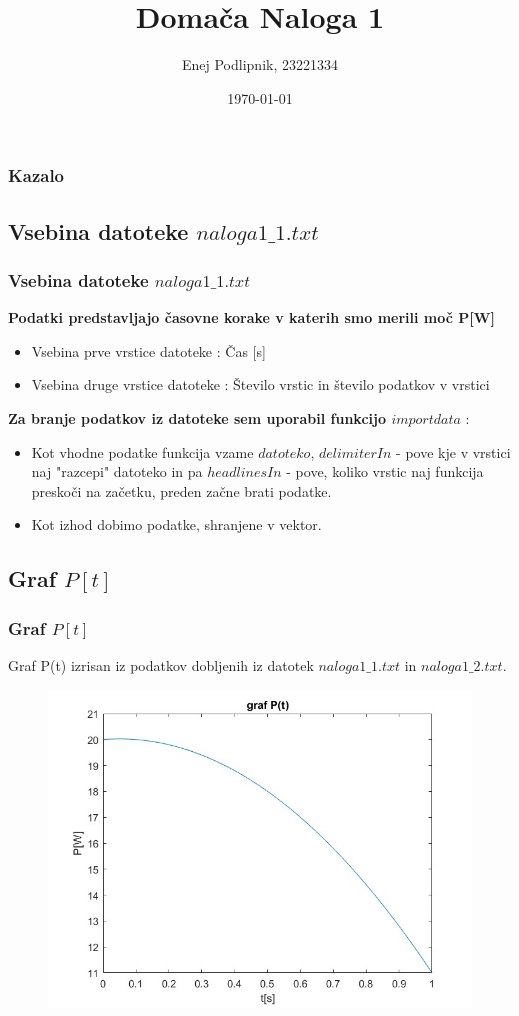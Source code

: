 \documentclass[10pt]{beamer}
\title{Domača Naloga 1}
\author{Enej Podlipnik, 23221334}
\institute{Fakulteta za strojništvo, Univerza v Ljubljani}
\date{\today}
\begin{document}
 
\frame{\titlepage}

\begin{frame}
\frametitle{Kazalo}
 \tableofcontents[sectionstyle=show, subsectionstyle=show]
\end{frame}

\begin{frame} 
\section{Vsebina datoteke $naloga1\_1.txt$}
\frametitle{Vsebina datoteke $naloga1\_ 1.txt$}
\textbf{Podatki predstavljajo časovne korake v katerih smo merili moč P[W]}
\begin{itemize}
    \item Vsebina prve vrstice datoteke : Čas [s]
    \item Vsebina druge vrstice datoteke : Število vrstic in število podatkov v vrstici
\end{itemize}
\vspace{5pt}
\textbf{Za branje podatkov iz datoteke sem uporabil funkcijo $importdata$} :
\begin{itemize}
    \item Kot vhodne podatke funkcija vzame $datoteko$, $delimiterIn$ - pove kje v vrstici naj "razcepi" datoteko in pa $headlinesIn$ - pove, koliko vrstic naj funkcija preskoči na začetku, preden začne brati podatke.
    \item Kot izhod dobimo podatke, shranjene v vektor.
\end{itemize}
\end{frame}
\begin{frame} 


\section{Graf $P[t]$}
\frametitle{Graf $P[t]$}  
\vspace{10pt}
Graf P(t) izrisan iz podatkov dobljenih iz datotek $naloga1\_1.txt$ in $naloga1\_2.txt$.
\begin{figure}
    \centering
    \includegraphics[width=0.9\linewidth]{grapP[t].jpg}
    \label{P(t)}
\end{figure}
\end{frame} 
\end{document}
